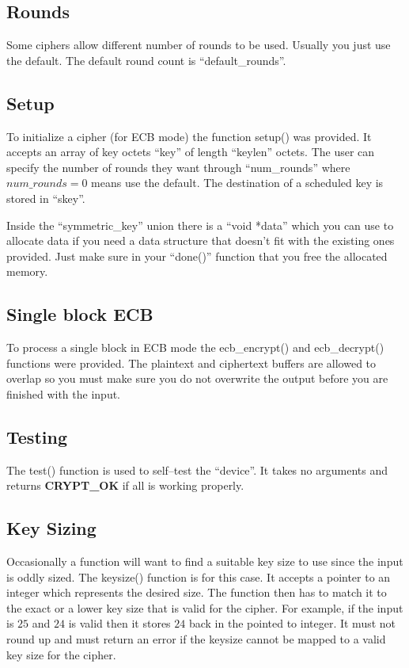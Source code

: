 \documentclass[a4paper]{book}
\begin{document}
\subsection{Rounds}
Some ciphers allow different number of rounds to be used.  Usually you just use the default.  The default round count is ``default\_rounds''.

\subsection{Setup}
To initialize a cipher (for ECB mode) the function setup() was provided.  It accepts an array of key octets ``key'' of length ``keylen'' octets.  The user
can specify the number of rounds they want through ``num\_rounds'' where $num\_rounds = 0$ means use the default.  The destination of a scheduled key is stored
in ``skey''.

Inside the ``symmetric\_key'' union there is a ``void *data'' which you can use to allocate data if you need a data structure that doesn't fit with the existing
ones provided.  Just make sure in your ``done()'' function that you free the allocated memory.

\subsection{Single block ECB}
To process a single block in ECB mode the ecb\_encrypt() and ecb\_decrypt() functions were provided.  The plaintext and ciphertext buffers are allowed to overlap so you 
must make sure you do not overwrite the output before you are finished with the input.

\subsection{Testing}
The test() function is used to self--test the ``device''.  It takes no arguments and returns \textbf{CRYPT\_OK} if all is working properly.

\subsection{Key Sizing}
Occasionally a function will want to find a suitable key size to use since the input is oddly sized.  The keysize() function is for this case.  It accepts a 
pointer to an integer which represents the desired size.  The function then has to match it to the exact or a lower key size that is valid for the cipher.  For
example, if the input is $25$ and $24$ is valid then it stores $24$ back in the pointed to integer.  It must not round up and must return an error if the keysize
 cannot be mapped to a valid key size for the cipher.
\end{document}
